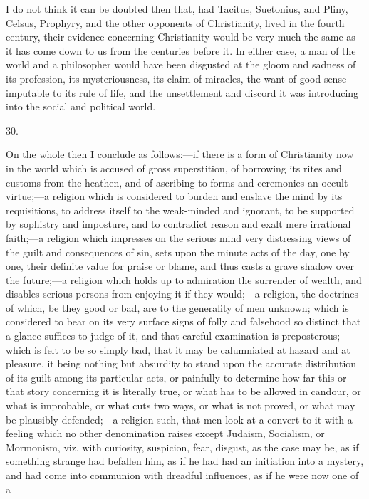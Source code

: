 I do not think it can be doubted then that, had
Tacitus, Suetonius, and Pliny, Celsus, Prophyry, and the
other opponents of Christianity, lived in the fourth
century, their evidence concerning Christianity would be
very much the same as it has come down to us from the
centuries before it. In either case, a man of the world
and a philosopher would have been disgusted at the gloom
and sadness of its profession, its mysteriousness, its
claim of miracles, the want of good sense imputable to
its rule of life, and the unsettlement and discord it was
introducing into the social and political world.

30.

On the whole then I conclude as follows:—if there
is a form of Christianity now in the world which is
accused of gross superstition, of borrowing its rites and
customs from the heathen, and of ascribing to forms and
ceremonies an occult virtue;—a religion which is
considered to burden and enslave the mind by its
requisitions, to address itself to the weak-minded and
ignorant, to be supported by sophistry and imposture, and
to contradict reason and exalt mere irrational
faith;—a religion which impresses on the serious
mind very distressing views of the guilt and consequences
of sin, sets upon the minute acts of the day, one by one,
their definite value for praise or blame, and thus casts
a grave shadow over the future;—a religion which
holds up to admiration the surrender of wealth, and
disables serious persons from enjoying it if they
would;—a religion, the doctrines of which, be they
good or bad, are to the generality of men unknown; which
is considered to bear on its very surface signs of folly
and falsehood so distinct that a glance suffices to judge
of it, and that careful examination is preposterous;
which is felt to be so simply bad, that it may be
calumniated at hazard and at pleasure, it being nothing
but absurdity to stand upon the accurate distribution of
its guilt among its particular acts, or painfully to
determine how far this or that story concerning it is
literally true, or what has to be allowed in candour, or
what is improbable, or what cuts two ways, or what is not
proved, or what may be plausibly defended;—a
religion such, that men look at a convert to it with a
feeling which no other denomination raises except
Judaism, Socialism, or Mormonism, viz. with curiosity,
suspicion, fear, disgust, as the case may be, as if
something strange had befallen him, as if he had had an
initiation into a mystery, and had come into communion
with dreadful influences, as if he were now one of a
